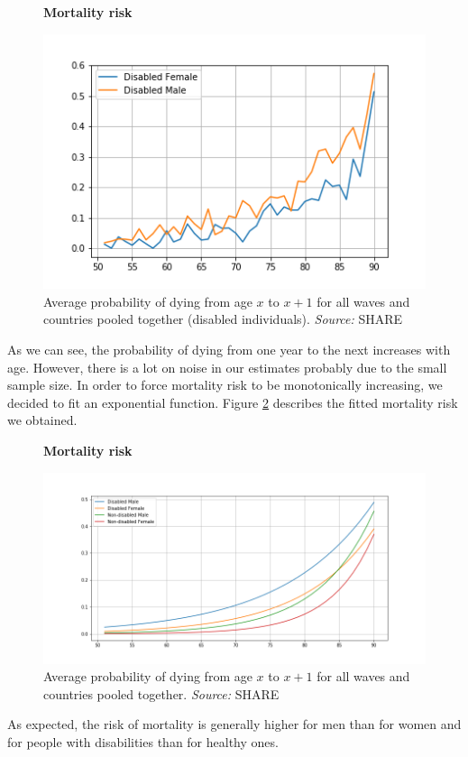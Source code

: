 \begin{figure}[H]
    \centering \textbf{Mortality risk}\par\medskip
        \centering
        \includegraphics[scale=.5]{images/mortality_regime_SHARE_disabled.png}
    \caption{Average probability of dying from age $x$ to $x+1$ for all waves and countries pooled together (disabled individuals). \textit{Source:} SHARE}
    \label{fig:mortality_risk_SHARE_disabled}
\end{figure}

As we can see, the probability of dying from one year to the next increases with age. However, there is a lot on noise in our estimates probably due to the small sample size. In order to force mortality risk to be monotonically increasing, we decided to fit an exponential function. Figure \ref{fig:mortality_risk_SHARE} describes the fitted mortality risk we obtained.


\begin{figure}[H]
    \centering \textbf{Mortality risk}\par\medskip
        \centering
        \includegraphics[scale=.5]{images/mortality_regime_SHARE.png}
    \caption{Average probability of dying from age $x$ to $x+1$ for all waves and countries pooled together. \textit{Source:} SHARE}
    \label{fig:mortality_risk_SHARE}
\end{figure}

As expected, the risk of mortality is generally higher for men than for women and for people with disabilities than for healthy ones. 

